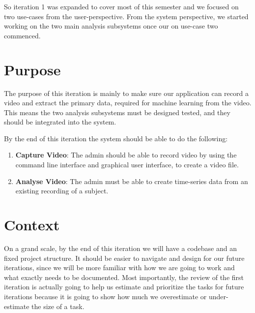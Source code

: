 \documentclass[12pt,a4paper,man]{report}
\begin{document}
So iteration 1 was expanded to cover most of this semester and we focused on two use-cases from the user-perspective. From the system perspective, we started working on the two main analysis subsystems once our on use-case two commenced. 

\section{Purpose}
\label{sec:org2fdb583}
The purpose of this iteration is mainly to make sure our application can record a video and extract the primary data, required for machine learning from the video. This means the two analysis subsystems must be designed tested, and they should be integrated into the system.

By the end of this iteration the system should be able to do the following:
\begin{enumerate}
\item \textbf{Capture Video}: The admin should be able to record video by using the command line interface and graphical user interface, to create a video file.
\item \textbf{Analyse Video}: The admin must be able to create time-series data from an existing recording of a subject.
\end{enumerate}


\section{Context}
\label{sec:orgbb26969}
On a grand scale, by the end of this iteration we will have a codebase and an fixed project structure. It should be easier to navigate and design for our future iterations, since we will be more familiar with how we are going to work and what exactly needs to be documented. Most importantly, the review of the first iteration is actually going to help us estimate and prioritize the tasks for future iterations because it is going to show how much we overestimate or under-estimate the size of a task.
\end{document}

